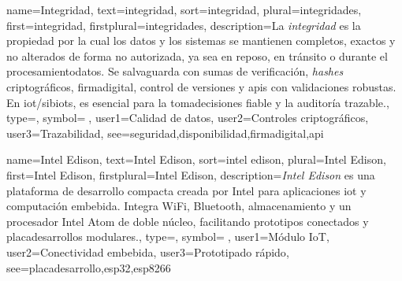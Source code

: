 	
	{
		name={Integridad},
		text={integridad},
		sort={integridad},
		plural={integridades},
		first={integridad},
		firstplural={integridades},
		description={La \emph{integridad} es la propiedad por la cual los \glspl{dato} y los \glspl{sistema} se mantienen completos, exactos y no alterados de forma no autorizada, ya sea en reposo, en tr{\'a}nsito o durante el \gls{procesamientodatos}. Se salvaguarda con sumas de verificaci{\'o}n, \textit{hashes} criptogr{\'a}ficos, \gls{firmadigital}, control de versiones y \glspl{api} con validaciones robustas. En \gls{iot}/\glspl{sibiot}, es esencial para la \gls{tomadecisiones} fiable y la auditor{\'i}a trazable.},
		type=\glsdefaulttype,
		symbol={🧷},
		user1={Calidad de datos},
		user2={Controles criptogr{\'a}ficos},
		user3={Trazabilidad},
		see={seguridad,disponibilidad,firmadigital,api}
	}
	
	{
		name={Intel Edison},
		text={Intel Edison},
		sort={intel edison},
		plural={Intel Edison},
		first={Intel Edison},
		firstplural={Intel Edison},
		description={\emph{Intel Edison} es una plataforma de desarrollo compacta creada por Intel para aplicaciones \gls{iot} y computaci{\'o}n embebida. Integra Wi\textendash Fi, Bluetooth, almacenamiento y un procesador Intel Atom de doble n{\'u}cleo, facilitando prototipos conectados y \glspl{placadesarrollo} modulares.},
		type=\glsdefaulttype,
		symbol={🧩},
		user1={M{\'o}dulo IoT},
		user2={Conectividad embebida},
		user3={Prototipado r{\'a}pido},
		see={placadesarrollo,esp32,esp8266}
	}
	
